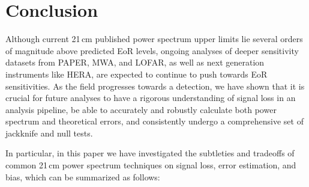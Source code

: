\documentclass[preprint2,numberedappendix,tighten]{aastex6}
\begin{document}


\section{Conclusion}
\label{sec:Con}

Although current 21\,cm published power spectrum upper limits lie several orders of magnitude above predicted EoR levels, 
ongoing analyses of deeper sensitivity datasets from PAPER, MWA, and LOFAR, as well as next generation instruments like 
HERA, are expected to continue to push towards EoR sensitivities. As the field progresses towards a detection, we have shown 
that it is crucial for future analyses to have a rigorous understanding of signal loss in an analysis pipeline, be able to accurately 
and robustly calculate both power spectrum and theoretical errors, and consistently undergo a comprehensive set of jackknife 
and null tests.

In particular, in this paper we have investigated the subtleties and tradeoffs of common 21\,cm power spectrum techniques on 
signal loss, error estimation, and bias, which can be summarized as follows:
\end{document}
